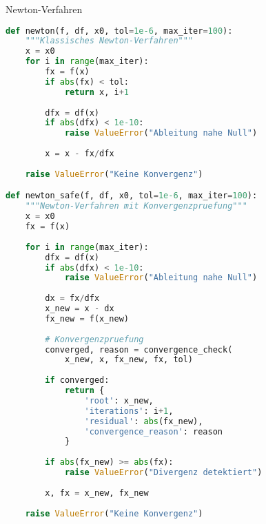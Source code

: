 \begin{examplecode}{Newton-Verfahren}
\begin{lstlisting}[language=Python, style=basesmol]
def newton(f, df, x0, tol=1e-6, max_iter=100):
    """Klassisches Newton-Verfahren"""
    x = x0
    for i in range(max_iter):
        fx = f(x)
        if abs(fx) < tol:
            return x, i+1
            
        dfx = df(x)
        if abs(dfx) < 1e-10:
            raise ValueError("Ableitung nahe Null")
            
        x = x - fx/dfx
        
    raise ValueError("Keine Konvergenz")

def newton_safe(f, df, x0, tol=1e-6, max_iter=100):
    """Newton-Verfahren mit Konvergenzpruefung"""
    x = x0
    fx = f(x)
    
    for i in range(max_iter):
        dfx = df(x)
        if abs(dfx) < 1e-10:
            raise ValueError("Ableitung nahe Null")
            
        dx = fx/dfx
        x_new = x - dx
        fx_new = f(x_new)
        
        # Konvergenzpruefung
        converged, reason = convergence_check(
            x_new, x, fx_new, fx, tol)
            
        if converged:
            return {
                'root': x_new,
                'iterations': i+1,
                'residual': abs(fx_new),
                'convergence_reason': reason
            }
            
        if abs(fx_new) >= abs(fx):
            raise ValueError("Divergenz detektiert")
            
        x, fx = x_new, fx_new
        
    raise ValueError("Keine Konvergenz")
\end{lstlisting}
\end{examplecode}

